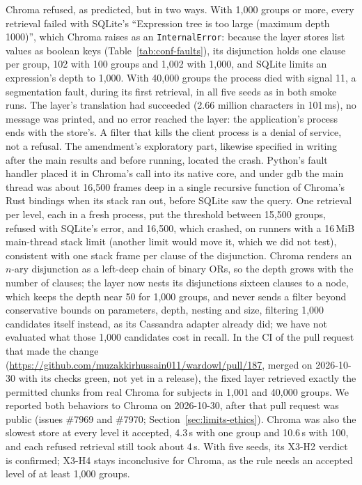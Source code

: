 Chroma refused, as predicted, but in two ways. With 1,000 groups or more, every retrieval failed with
SQLite's ``Expression tree is too large (maximum depth 1000)'', which Chroma raises as an
\texttt{InternalError}: because the layer stores list values as boolean keys
(Table~\ref{tab:conf-faults}), its disjunction holds one clause per group, 102 with 100 groups and
1,002 with 1,000, and SQLite limits an expression's depth to 1,000. With 40,000 groups the process
died with signal 11, a segmentation fault, during its first retrieval, in all five seeds as in both
smoke runs. The layer's translation had succeeded (2.66 million characters in 101\,ms), no message was
printed, and no error reached the layer: the application's process ends with the store's. A filter
that kills the client process is a denial of service, not a refusal. The amendment's exploratory
part, likewise specified in writing after the main results and before running,
located the crash. Python's fault handler placed it in Chroma's call into its native core, and under gdb the main
thread was about 16,500 frames deep in a single recursive function of Chroma's Rust bindings when its
stack ran out, before SQLite saw the query. One retrieval per level, each in a fresh process, put the
threshold between 15,500 groups, refused with SQLite's error, and 16,500, which crashed, on runners with a 16\,MiB main-thread stack limit (another limit would move it, which we did not test), consistent
with one stack frame per clause of the disjunction. Chroma renders an $n$-ary
disjunction as a left-deep chain of binary ORs, so the depth grows with the number of clauses; the
layer now nests its disjunctions sixteen clauses to a node, which keeps the depth near 50 for 1,000
groups, and never sends a filter beyond conservative bounds on parameters, depth, nesting and size,
filtering 1,000 candidates itself instead, as its Cassandra adapter already did; we have not evaluated
what those 1,000 candidates cost in recall. In the CI of the pull request that made the change
(\url{https://github.com/muzakkirhussain011/wardowl/pull/187}, merged on 2026-10-30 with its checks
green, not yet in a release), the fixed layer retrieved exactly the permitted chunks from real Chroma
for subjects in 1,001 and 40,000 groups. We reported both behaviors to Chroma on 2026-10-30, after that pull request was public (issues \#7969 and \#7970; Section~\ref{sec:limits-ethics}). Chroma was also the slowest store at every level
it accepted, 4.3\,s with one group and 10.6\,s with 100, and each refused retrieval still took about
4\,s. With five seeds, its X3-H2 verdict is confirmed; X3-H4 stays inconclusive for Chroma, as the
rule needs an accepted level of at least 1,000 groups.
